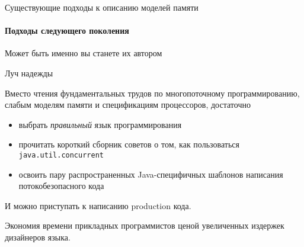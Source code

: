 \begin{frame}{Существующие подходы к описанию моделей памяти}
\framesubtitle{Подходы следующего поколения}

\pause
 
 Может быть именно вы станете их автором

\end{frame}




% 
% 
% 
% 
% 
% 


\begin{frame}{Луч надежды}

Вместо чтения фундаментальных трудов по многопоточному программированию, слабым моделям памяти и спецификациям процессоров, достаточно
\begin{itemize}
	\pause
	\item выбрать \textit{правильный} язык программирования

	\pause
	\item прочитать короткий сборник советов о том, как пользоваться \texttt{java.util.concurrent}

	\pause
	\item освоить пару распространенных Java-специфичных шаблонов написания потокобезопасного кода 
\end{itemize}

\pause
И можно приступать к написанию production кода.

\pause
Экономия времени прикладных программистов ценой увеличенных издержек дизайнеров языка.

\end{frame}


